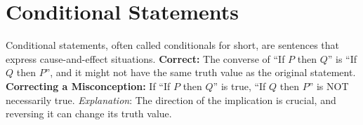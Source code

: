 \documentclass[12pt]{article}
\newenvironment{correct}{\noindent\textbf{Correct:}}{}
\newenvironment{misconception}{\noindent\textbf{Correcting a Misconception:}}{}
\newenvironment{explanation}{\noindent\textit{Explanation}:}{\vspace{1em}}
\begin{document}
\section*{Conditional Statements}
Conditional statements, often called conditionals for short, are sentences that express cause-and-effect situations.
\begin{correct} The converse of ``If \(P\) then \(Q\)'' is ``If \(Q\) then \(P\)'', and it might not have the same truth value as the original statement. \end{correct}
\begin{misconception} If ``If \(P\) then \(Q\)'' is true, ``If \(Q\) then \(P\)'' is NOT necessarily true. \end{misconception}
\begin{explanation} The direction of the implication is crucial, and reversing it can change its truth value. \end{explanation}
\end{document}
